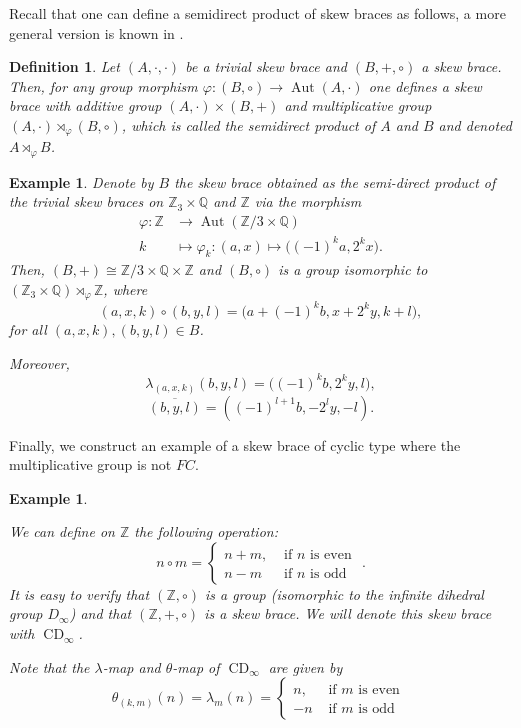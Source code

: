 \documentclass{amsart}
\newcommand{\Aut}{\operatorname{Aut}}
\newcommand{\Q}{\mathbb{Q}}
\newcommand{\Z}{\mathbb{Z}}
\newcommand{\CD}{\operatorname{CD}}
\newtheorem{defn}[thm]{Definition}
\newtheorem{exa}[thm]{Example}
\begin{document}
Recall that one can define a semidirect product of skew braces as follows, a more general version is known in \cite{Facchini}.

\begin{defn}
    Let $(A,\cdot,\cdot)$ be a trivial skew brace and $(B,+,\circ)$ a skew brace. Then, for any group morphism $\varphi: (B,\circ) \rightarrow \Aut(A,\cdot)$ one defines a skew brace
    with additive group $(A,\cdot) \times (B,+)$ and multiplicative group $(A,\cdot) \rtimes_{\varphi} (B,\circ)$, which is called the semidirect product of $A$ and $B$ and denoted $A \rtimes_{\varphi} B$.
\end{defn}

\begin{exa}\label{rosita}
Denote by $B$ the skew brace obtained as the semi-direct product of the trivial skew braces on $\mathbb{Z}_3 \times \mathbb{Q}$ and $\Z$ via the morphism \begin{align*}
    \varphi:\Z&\to \Aut(\Z/3\times\Q)\\
    k&\mapsto \varphi_k:(a,x)\mapsto \big((-1)^ka,2^kx\big).
\end{align*}
Then,  $(B,+) \cong \Z/3\times \Q\times \Z$ and $(B,\circ)$ is a group isomorphic to $(\Z_3\times \Q)\rtimes_\varphi \Z$, where
\[
(a,x,k)\circ(b,y,l) = \big(a+(-1)^kb, x+2^ky, k+l\big),
\]
for all $(a,x,k),(b,y,l)\in B$.

Moreover, 
$$\lambda_{(a,x,k)}(b,y,l)=\big((-1)^kb, 2^ky, l\big),$$
$$\overline{(b,y,l)}=((-1)^{l+1}b,-2^ly,-l).$$

\end{exa}
Finally, we construct an example of a skew brace of cyclic type where the multiplicative group is not $FC$.
\begin{exa}\label{es1}
    

     We can define on $\Z$ the following operation:
    \[
    n\circ m=\begin{cases}
        n+m, &\text{ if }n \text{ is even }\\
        n-m &\text{ if }n \text{ is odd }
    \end{cases}.
    \]
    It is easy to verify that $(\Z,\circ)$ is a group (isomorphic to the infinite dihedral group $D_\infty$)
    and that $(\Z,+,\circ)$ is a skew brace. We will denote this skew brace with $\CD_\infty$.


Note that the $\lambda$-map and $\theta$-map of $\CD_\infty$ are given by
\[
\theta_{(k,m)}(n)=\lambda_m(n)=\begin{cases}
        n, &\text{ if }m \text{ is even }\\
        -n &\text{ if }m \text{ is odd }
    \end{cases}
\]
\end{exa}
\end{document}
